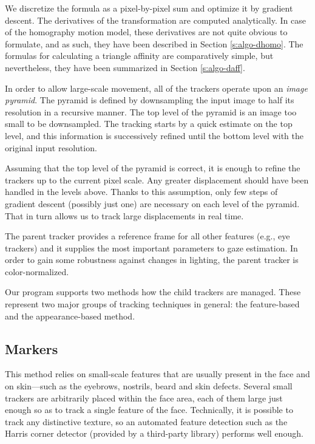 We discretize the formula as a pixel-by-pixel sum and optimize it by gradient descent.
The derivatives of the transformation are computed analytically.
In case of the homography motion model, these derivatives are not quite obvious to formulate, and as such, they have been described in Section \ref{s:algo-dhomo}.
The formulas for calculating a triangle affinity are comparatively simple, but nevertheless, they have been summarized in Section \ref{s:algo-daff}.

In order to allow large-scale movement, all of the trackers operate upon an \textit{image pyramid}.
The pyramid is defined by downsampling the input image to half its resolution in a recursive manner.
The top level of the pyramid is an image too small to be downsampled.
The tracking starts by a quick estimate on the top level, and this information is successively refined until the bottom level with the original input resolution.

Assuming that the top level of the pyramid is correct, it is enough to refine the trackers up to the current pixel scale.
Any greater displacement should have been handled in the levels above.
Thanks to this assumption, only few steps of gradient descent (possibly just one) are necessary on each level of the pyramid.
That in turn allows us to track large displacements in real time.

The parent tracker provides a reference frame for all other features (e.g., eye trackers) and it supplies the most important parameters to gaze estimation.
In order to gain some robustness against changes in lighting, the parent tracker is color-normalized.

Our program supports two methods how the child trackers are managed.
These represent two major groups of tracking techniques in general: the feature-based and the appearance-based method.

\subsection{Markers}

This method relies on small-scale features that are usually present in the face and on skin---such as the eyebrows, nostrils, beard and skin defects.
Several small trackers are arbitrarily placed within the face area, each of them large just enough so as to track a single feature of the face.
Technically, it is possible to track any distinctive texture, so an automated feature detection such as the Harris corner detector (provided by a third-party library) performs well enough.

